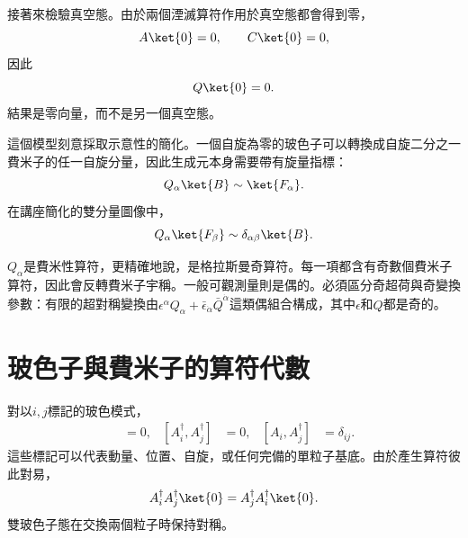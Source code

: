 接著來檢驗真空態。由於兩個湮滅算符作用於真空態都會得到零，
\begin{equation}
A\ket{0}=0,\qquad C\ket{0}=0,
\end{equation}
因此
\begin{equation}
Q\ket{0}=0.
\end{equation}
結果是零向量，而不是另一個真空態。

這個模型刻意採取示意性的簡化。一個自旋為零的玻色子可以轉換成自旋二分之一費米子的任一自旋分量，因此生成元本身需要帶有旋量指標：
\begin{equation}
Q_\alpha\ket{B}\sim\ket{F_\alpha}.
\end{equation}
在講座簡化的雙分量圖像中，
\begin{equation}
Q_\alpha\ket{F_\beta}\sim\delta_{\alpha\beta}\ket{B}.
\end{equation}

\begin{classroomqa}
\end{classroomqa}

\(Q_\alpha\)是費米性算符，更精確地說，是格拉斯曼奇算符。每一項都含有奇數個費米子算符，因此會反轉費米子宇稱。一般可觀測量則是偶的。必須區分奇超荷與奇變換參數：有限的超對稱變換由\(\epsilon^\alpha Q_\alpha+\bar\epsilon_{\dot\alpha}\bar Q^{\dot\alpha}\)這類偶組合構成，其中\(\epsilon\)和\(Q\)都是奇的。

\section{玻色子與費米子的算符代數}

對以\(i,j\)標記的玻色模式，
\begin{align}
[A_i,A_j]&=0,&
[A_i^\dagger,A_j^\dagger]&=0,&
[A_i,A_j^\dagger]&=\delta_{ij}.
\end{align}
這些標記可以代表動量、位置、自旋，或任何完備的單粒子基底。由於產生算符彼此對易，
\begin{equation}
A_i^\dagger A_j^\dagger\ket{0}
=A_j^\dagger A_i^\dagger\ket{0}.
\end{equation}
雙玻色子態在交換兩個粒子時保持對稱。

